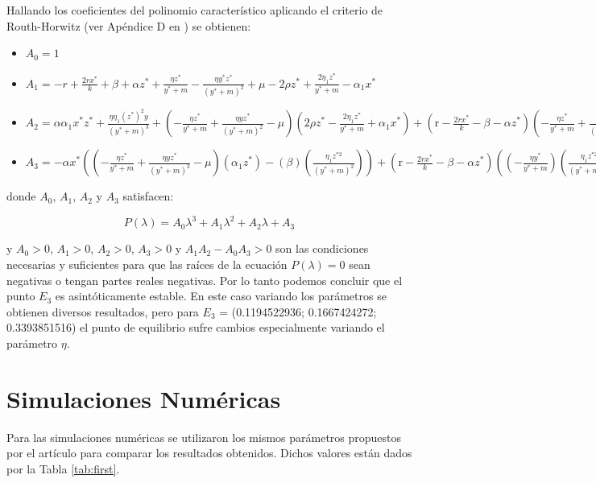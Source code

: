 \documentclass{wscpaperproc}
\theoremstyle{wsc}
\begin{document}
Hallando los coeficientes del polinomio característico aplicando el criterio de Routh-Horwitz (ver Apéndice D en \cite{castellanos_existence_2017}) se obtienen:


\begin{itemize}
	\item[] $A_0 = 1$

	\item[] $A_1 = -r + \frac{2rx^*}{k} + \beta + \alpha z^*  + \frac{\eta z^*}{y^*+m} - \frac{\eta y^*z^*}{(y^*+m)^2} + \mu - 2 \rho z^* + \frac{2\eta_1 z^*}{y^*+m} - \alpha_1 x^*$

	\item[] $A_2 = \alpha \alpha_1 x^* z^* + \frac{\eta \eta_1 (z^*)^{2} y}{(y^*+m)^3} + (-\frac{\eta z^*}{y^*+m}+\frac{\eta y z^*}{(y^*+m)^2}-\mu )(2 \rho z^*-\frac{2 \eta_1 z^*}{y^*+m}+\alpha_1 x^*) + (\mathrm{r}-\frac{2 r x^*}{k}-\beta-\alpha z^*)(-\frac{\eta z^*}{y^*+m}+\frac{\eta y z^*}{(y^*+m)^2}-\mu +2 \rho z^*-\frac{2 \eta_1 z^*}{y^*+m}+\alpha_1 x^*)$

	\item[] $A_3 = -\alpha x^* ((-\frac{\eta z^*}{y^*+m}+\frac{\eta y z^*}{(y^*+m)^2}-\mu)(\alpha_1 z^* ) - (\beta) (\frac{\eta_1 z^{* 2}}{(y^*+m)^2}) ) + (\mathrm{r}-\frac{2 r x^*}{k}-\beta-\alpha z^*) ((-\frac{\eta y^*}{y^*+m} )(\frac{\eta_1 z^{* 2}}{(y^*+m)^2}) - (-\frac{\eta z^*}{y^*+m}+\frac{\eta y z^*}{(y^*+m)^2}-\mu)(2 \rho z^*-\frac{2 \eta_1 z^*}{y^*+m}+\alpha_1 x^*))	$
	
\end{itemize}
donde $A_0$, $A_1$, $A_2$  y $A_3$ satisfacen:

$$P(\lambda) = A_0\lambda^3 + A_1\lambda^2 + A_2\lambda + A_3$$

y $A_0 > 0$, $A_1 > 0$, $A_2 > 0$, $A_3 > 0$ y $A_1 A_2 - A_0 A_3 > 0$ son las condiciones necesarias y suficientes
para que las raíces de la ecuación $P(\lambda) = 0$ sean negativas o tengan partes reales negativas. Por lo tanto podemos 
concluir que el punto $E_3$ es asint\'oticamente estable. En este caso variando los par\'ametros se obtienen diversos resultados, 
pero para  $E_3$ = (0.1194522936; 0.1667424272; 0.3393851516) el punto de equilibrio sufre cambios especialmente variando el par\'ametro $\eta$.

\section{Simulaciones Numéricas}
Para las simulaciones numéricas se utilizaron los mismos parámetros propuestos por el artículo para comparar los resultados obtenidos.
Dichos valores están dados por la Tabla \ref{tab:first}.
\end{document}
